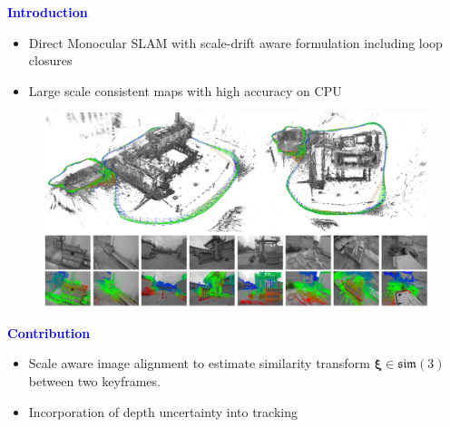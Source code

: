 \documentclass[aspectratio=169]{beamer}
\begin{document}
\begin{frame}{\textcolor{blue}{\textbf{Introduction}}}
	\vspace{-0.5cm}
	\begin{block}{}
	\begin{itemize}
			\item Direct Monocular SLAM with scale-drift aware formulation including loop closures 
			\item Large scale consistent maps with high accuracy on CPU
	\end{itemize}
	\end{block}

	\begin{figure}
		\centering
		\includegraphics[height=0.5\textheight]{pics/lsd_slam_map_intro.png}
	\end{figure}

\end{frame}

\begin{frame}{\textcolor{blue}{\textbf{Contribution}}}
	\vspace{-0.5cm}
	\begin{itemize}
			\item Scale aware image alignment to estimate similarity transform $\boldsymbol{\xi} \in \mathfrak{s i m}(3)$ between two keyframes.
			\item Incorporation of depth uncertainty into tracking
	\end{itemize}

\end{frame}


\end{document}
